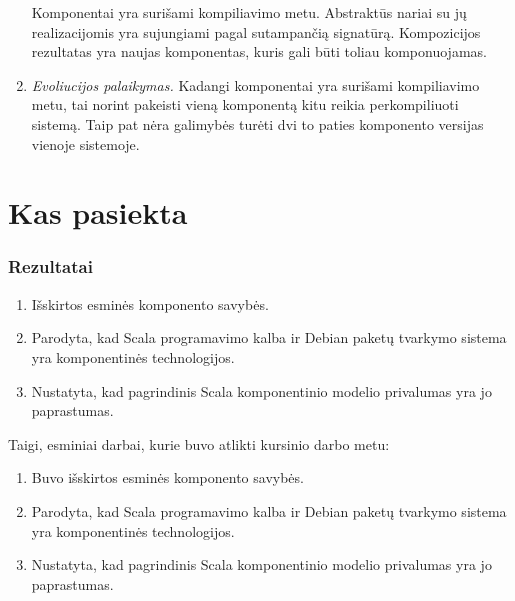 \begin{frame}
\begin{handout}
\begin{enumerate}
        Komponentai yra surišami kompiliavimo metu. Abstraktūs nariai su
        jų realizacijomis yra sujungiami pagal sutampančią signatūrą.
        Kompozicijos rezultatas yra naujas komponentas, kuris gali būti
        toliau komponuojamas.
      \item \emph{Evoliucijos palaikymas.}
        Kadangi komponentai yra surišami kompiliavimo metu, tai norint
        pakeisti vieną komponentą kitu reikia perkompiliuoti sistemą.
        Taip pat nėra galimybės turėti dvi to paties komponento versijas
        vienoje sistemoje.
    \end{enumerate}
  \end{handout}
\end{frame}

\section{Kas pasiekta}

\begin{frame}
  \frametitle{Rezultatai}
  \begin{enumerate}
    \item Išskirtos esminės komponento savybės.
    \item Parodyta, kad Scala programavimo kalba ir Debian paketų
      tvarkymo sistema yra komponentinės technologijos.
    \item Nustatyta, kad pagrindinis Scala komponentinio modelio
      privalumas yra jo paprastumas.
  \end{enumerate}
  \begin{handout}
    Taigi, esminiai darbai, kurie buvo atlikti kursinio darbo metu:
    \begin{enumerate}
      \item Buvo išskirtos esminės komponento savybės.
      \item Parodyta, kad Scala programavimo kalba ir Debian paketų
        tvarkymo sistema yra komponentinės technologijos.
      \item Nustatyta, kad pagrindinis Scala komponentinio modelio
        privalumas yra jo paprastumas.
    \end{enumerate}
  \end{handout}
\end{frame}

